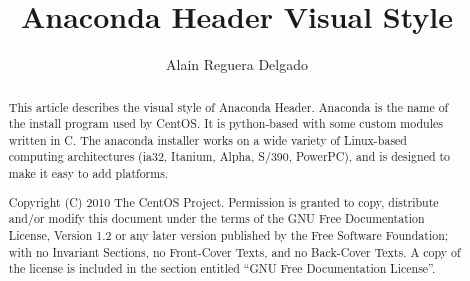 \documentclass[12pt]{article}
\title{Anaconda Header Visual Style}
\author{Alain Reguera Delgado}
\begin{document}
\maketitle

\begin{abstract} 

This article describes the visual style of Anaconda Header. Anaconda
is the name of the install program used by CentOS.  It is python-based
with some custom modules written in C. The anaconda installer works on
a wide variety of Linux-based computing architectures (ia32, Itanium,
Alpha, S/390, PowerPC), and is designed to make it easy to add
platforms.

Copyright (C) 2010 The CentOS Project. Permission is granted to copy,
distribute and/or modify this document under the terms of the GNU Free
Documentation License, Version 1.2 or any later version published by
the Free Software Foundation; with no Invariant Sections, no
Front-Cover Texts, and no Back-Cover Texts. A copy of the license is
included in the section entitled ``GNU Free Documentation License''.  

\end{abstract}

\tableofcontents








\end{document}
